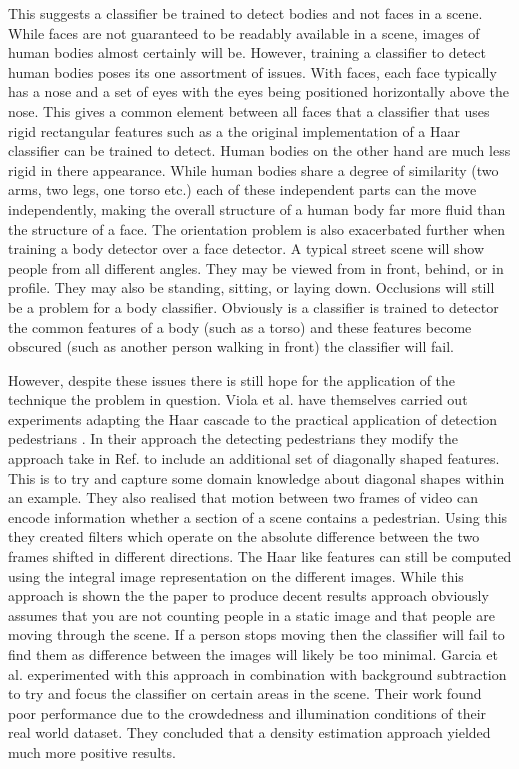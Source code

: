 \documentclass[conference]{IEEEtran}
\begin{document}
This suggests a classifier be trained to detect bodies and not faces in a scene. While faces are not guaranteed to be readably available in a scene, images of human bodies almost certainly will be. However, training a classifier to detect human bodies poses its one assortment of issues. With faces, each face typically has a nose and a set of eyes with the eyes being positioned horizontally above the nose. This gives a common element between all faces that a classifier that uses rigid rectangular features such as a the original implementation of a Haar classifier can be trained to detect. Human bodies on the other hand are much less rigid in there appearance. While human bodies share a degree of similarity (two arms, two legs, one torso etc.) each of these independent parts can the move independently, making the overall structure of a human body far more fluid than the structure of a face. The orientation problem is also exacerbated further when training a body detector over a face detector. A typical street scene will show people from all different angles. They may be viewed from in front, behind, or in profile. They may also be standing, sitting, or laying down. Occlusions will still be a problem for a body classifier. Obviously is a classifier is trained to detector the common features of a body (such as a torso) and these features become obscured (such as another person walking in front) the classifier will fail.

However, despite these issues there is still hope for the application of the technique the problem in question. Viola et al. have themselves carried out experiments adapting the Haar cascade to the practical application of detection pedestrians \cite{viola2003detecting}. In their approach the detecting pedestrians they modify the approach take in Ref. \cite{viola2004robust} to include an additional set of diagonally shaped features. This is to try and capture some domain knowledge about diagonal shapes within an example. They also realised that motion between two frames of video can encode information whether a section of a scene contains a pedestrian. Using this they created filters which operate on the absolute difference between the two frames shifted in different directions. The Haar like features can still be computed using the integral image representation on the different images. While this approach is shown the the paper to produce decent results approach obviously assumes that you are not counting people in a static image and that people are moving through the scene. If a person stops moving then the classifier will fail to find them as difference between the images will likely be too minimal. Garcia et al. \cite{garcia2008effective} experimented with this approach in combination with background subtraction to try and focus the classifier on certain areas in the scene. Their work found poor performance due to the crowdedness and illumination conditions of their real world dataset. They concluded that a density estimation approach yielded much more positive results.
\end{document}

